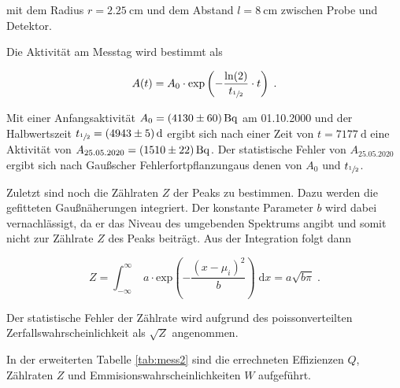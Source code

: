 mit dem Radius $r = \SI{2.25}{\centi\meter}$ und dem Abstand $l = \SI{8}{\centi\meter}$ zwischen Probe und Detektor.

Die Aktivität am Messtag wird bestimmt als

\begin{equation}
  A(t) = A_0 \cdot \text{exp} \left(- \frac{\text{ln}(2)}{t_{\sfrac{1}{2}}} \cdot t \right)  \; .
\end{equation}

Mit einer Anfangsaktivität $A_0 = \SI{4130 +- 60}{\becquerel}$ am 01.10.2000 und der Halbwertszeit
$t_{\sfrac{1}{2}} = \SI{4943 +- 5}{\day}$ ergibt sich nach einer Zeit von $t = \SI{7177}{\day}$
eine Aktivität von $A_{25.05.2020} = \SI{1510 +- 22}{\becquerel}$.
Der statistische Fehler von $A_{25.05.2020}$ ergibt sich nach 
Gaußscher Fehlerfortpflanzungaus denen von $A_0$ und $t_{\sfrac{1}{2}}$.

Zuletzt sind noch die Zählraten $Z$ der Peaks zu bestimmen. Dazu werden die gefitteten Gaußnäherungen integriert. 
Der konstante Parameter $b$ wird dabei vernachlässigt, da er das Niveau des umgebenden Spektrums angibt und somit nicht zur 
Zählrate $Z$ des Peaks beiträgt. Aus der Integration folgt dann

\begin{equation}
  Z = \int_{-\infty}^\infty \; a \cdot \text{exp}\left( - \frac{(x-\mu_i)^2}{b}\right) \; \text{d}x = a \sqrt{b\pi} \; .
\end{equation}

Der statistische Fehler der Zählrate wird aufgrund des poissonverteilten Zerfallswahrscheinlichkeit als $\sqrt{Z}$ angenommen.

In der erweiterten Tabelle \ref{tab:mess2} sind die errechneten Effizienzen $Q$, Zählraten $Z$ und 
Emmisionswahrscheinlichkeiten $W$ aufgeführt.

